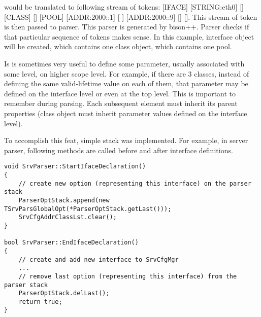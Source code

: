 would be translated to following stream of tokens: [IFACE]
[STRING:eth0] [{] [CLASS] [{] [POOL] [ADDR:2000::1] [-] [ADDR:2000::9]
[}] [}]. This stream of token is then passed to parser. This parser is
generated by bison++. Parser checks if that particular sequence of
tokens makes sense. In this example, interface object will be created,
which contains one class object, which contains one pool.

Is is sometimes very useful to define some parameter, usually
associated with some level, on higher scope level. For example, if
there are 3 classes, instead of defining the same valid-lifetime value
on each of them, that parameter may be defined on the interface
level or even at the top level. This is important to remember during
parsing. Each subsequent element must inherit its parent properties
(class object must inherit parameter values defined on the interface
level).

To accomplish this feat, simple stack was implemented. For example, in
server parser, following methods are called before and after interface
definitions.

\begin{verbatim}
void SrvParser::StartIfaceDeclaration()
{
    // create new option (representing this interface) on the parser stack
    ParserOptStack.append(new TSrvParsGlobalOpt(*ParserOptStack.getLast()));
    SrvCfgAddrClassLst.clear();
}

bool SrvParser::EndIfaceDeclaration()
{
    // create and add new interface to SrvCfgMgr
    ...
    // remove last option (representing this interface) from the parser stack
    ParserOptStack.delLast();
    return true;
}   
\end{verbatim}


